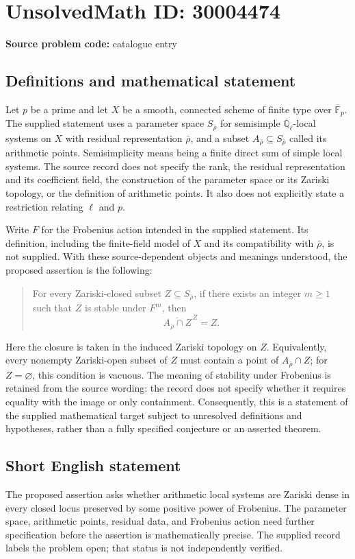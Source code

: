 \documentclass[11pt]{article}
\begin{document}
\section*{UnsolvedMath ID: 30004474}
\textbf{Source problem code:} catalogue entry
\subsection{Definitions and mathematical statement}
Let \(p\) be a prime and let \(X\) be a smooth, connected scheme of finite type over \(\overline{\mathbb F}_p\). The supplied statement uses a parameter space \(S_{\bar\rho}\) for semisimple \(\overline{\mathbb Q}_\ell\)-local systems on \(X\) with residual representation \(\bar\rho\), and a subset \(A_{\bar\rho}\subseteq S_{\bar\rho}\) called its arithmetic points. Semisimplicity means being a finite direct sum of simple local systems. The source record does not specify the rank, the residual representation and its coefficient field, the construction of the parameter space or its Zariski topology, or the definition of arithmetic points. It also does not explicitly state a restriction relating \(\ell\) and \(p\).

Write \(F\) for the Frobenius action intended in the supplied statement. Its definition, including the finite-field model of \(X\) and its compatibility with \(\bar\rho\), is not supplied. With these source-dependent objects and meanings understood, the proposed assertion is the following:
\begin{quote}
For every Zariski-closed subset \(Z\subseteq S_{\bar\rho}\), if there exists an integer \(m\geq 1\) such that \(Z\) is stable under \(F^m\), then
\[
\overline{A_{\bar\rho}\cap Z}^{\,Z}=Z.
\]
\end{quote}
Here the closure is taken in the induced Zariski topology on \(Z\). Equivalently, every nonempty Zariski-open subset of \(Z\) must contain a point of \(A_{\bar\rho}\cap Z\); for \(Z=\varnothing\), this condition is vacuous. The meaning of stability under Frobenius is retained from the source wording: the record does not specify whether it requires equality with the image or only containment. Consequently, this is a statement of the supplied mathematical target subject to unresolved definitions and hypotheses, rather than a fully specified conjecture or an asserted theorem.
\subsection{Short English statement}
The proposed assertion asks whether arithmetic local systems are Zariski dense in every closed locus preserved by some positive power of Frobenius. The parameter space, arithmetic points, residual data, and Frobenius action need further specification before the assertion is mathematically precise. The supplied record labels the problem open; that status is not independently verified.
\end{document}
